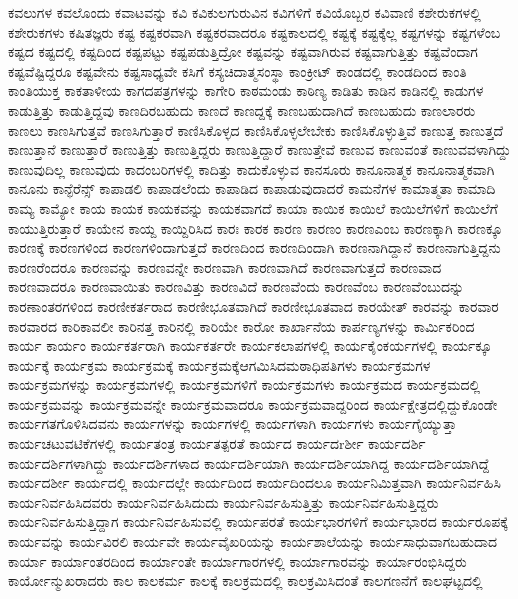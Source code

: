 {ಕವಲುಗಳ
ಕವಲೊಂದು
ಕವಾಟವನ್ನು
ಕವಿ
ಕವಿಕುಲಗುರುವಿನ
ಕವಿಗಳಿಗೆ
ಕವಿಯೊಬ್ಬರ
ಕವಿವಾಣಿ
ಕಶೇರುಕಗಳಲ್ಲಿ
ಕಶೇರುಕಗಳು
ಕಷಿತಜ್ಞರು
ಕಷ್ಟ
ಕಷ್ಟಕರವಾಗಿ
ಕಷ್ಟಕರವಾದರೂ
ಕಷ್ಟಕಾಲದಲ್ಲಿ
ಕಷ್ಟಕ್ಕೆ
ಕಷ್ಟಕ್ಕೆಲ್ಲ
ಕಷ್ಟಗಳನ್ನು
ಕಷ್ಟಗಳೆಂಬ
ಕಷ್ಟದ
ಕಷ್ಟದಲ್ಲಿ
ಕಷ್ಟದಿಂದ
ಕಷ್ಟಪಟ್ಟು
ಕಷ್ಟಪಡುತ್ತಿದ್ರೋ
ಕಷ್ಟವನ್ನು
ಕಷ್ಟವಾಗಿರುವ
ಕಷ್ಟವಾಗುತ್ತಿತ್ತು
ಕಷ್ಟವೆಂದಾಗ
ಕಷ್ಟವೆಷ್ಟಿದ್ದರೂ
ಕಷ್ಟವೇನು
ಕಷ್ಟಸಾಧ್ಯವೇ
ಕಸಿಗೆ
ಕಸ್ಯಚಿದಾತ್ಮಸಂಸ್ಥಾ
ಕಾಂಕ್ರೀಟ್
ಕಾಂಡದಲ್ಲಿ
ಕಾಂಡದಿಂದ
ಕಾಂತಿ
ಕಾಂತಿಯುಕ್ತ
ಕಾಕತಾಳೀಯ
ಕಾಗದಪತ್ರಗಳನ್ನು
ಕಾಗೇರಿ
ಕಾಠಮಂಡು
ಕಾಠಿಣ್ಯ
ಕಾಡಿತು
ಕಾಡಿನ
ಕಾಡಿನಲ್ಲಿ
ಕಾಡುಗಳ
ಕಾಡುತ್ತಿತ್ತು
ಕಾಡುತ್ತಿದ್ದವು
ಕಾಣದಿರಬಹುದು
ಕಾಣದೆ
ಕಾಣದ್ದಕ್ಕೆ
ಕಾಣಬಹುದಾಗಿದೆ
ಕಾಣಬಹುದು
ಕಾಣಲಾರರು
ಕಾಣಲು
ಕಾಣಸಿಗುತ್ತವೆ
ಕಾಣಸಿಗುತ್ತಾರೆ
ಕಾಣಿಸಿಕೊಳ್ಳದ
ಕಾಣಿಸಿಕೊಳ್ಳಲೇಬೇಕು
ಕಾಣಿಸಿಕೊಳ್ಳುತ್ತಿವೆ
ಕಾಣುತ್ತ
ಕಾಣುತ್ತದೆ
ಕಾಣುತ್ತಾನೆ
ಕಾಣುತ್ತಾರೆ
ಕಾಣುತ್ತಿತ್ತು
ಕಾಣುತ್ತಿದ್ದರು
ಕಾಣುತ್ತಿದ್ದಾರೆ
ಕಾಣುತ್ತೇವೆ
ಕಾಣುವ
ಕಾಣುವಂತೆ
ಕಾಣುವವಳಾಗಿದ್ದು
ಕಾಣುವುದಿಲ್ಲ
ಕಾಣುವುದು
ಕಾದಂಬರಿಗಳಲ್ಲಿ
ಕಾದಿತ್ತು
ಕಾದುಕೊಳ್ಳುವ
ಕಾನಸೂರು
ಕಾನೂನಾತ್ಮಕ
ಕಾನೂನಾತ್ಮಕವಾಗಿ
ಕಾನೂನು
ಕಾನ್ಫೆರೆನ್ಸ್
ಕಾಪಾಡಲಿ
ಕಾಪಾಡಲೆಂದು
ಕಾಪಾಡಿದ
ಕಾಪಾಡುವುದಾದರೆ
ಕಾಮನೆಗಳ
ಕಾಮಾತ್ಮತಾ
ಕಾಮಾದಿ
ಕಾಮ್ಯ
ಕಾಮ್ಯೋ
ಕಾಯ
ಕಾಯಕ
ಕಾಯಕವನ್ನು
ಕಾಯಕವಾಗದೆ
ಕಾಯಾ
ಕಾಯಿಕ
ಕಾಯಿಲೆ
ಕಾಯಿಲೆಗಳಿಗೆ
ಕಾಯಿಲೆಗೆ
ಕಾಯುತ್ತಿರುತ್ತಾರೆ
ಕಾಯೇನ
ಕಾಯ್ದ
ಕಾಯ್ದಿರಿಸಿದ
ಕಾರಃ
ಕಾರಕ
ಕಾರಣ
ಕಾರಣಂ
ಕಾರಣಎಂಬ
ಕಾರಣಕ್ಕಾಗಿ
ಕಾರಣಕ್ಕೂ
ಕಾರಣಕ್ಕೆ
ಕಾರಣಗಳಿಂದ
ಕಾರಣಗಳಿಂದಾಗುತ್ತದೆ
ಕಾರಣದಿಂದ
ಕಾರಣದಿಂದಾಗಿ
ಕಾರಣನಾಗಿದ್ದಾನೆ
ಕಾರಣನಾಗುತ್ತಿದ್ದನು
ಕಾರಣರೆಂದರೂ
ಕಾರಣವನ್ನು
ಕಾರಣವನ್ನೇ
ಕಾರಣವಾಗಿ
ಕಾರಣವಾಗಿದೆ
ಕಾರಣವಾಗುತ್ತದೆ
ಕಾರಣವಾದ
ಕಾರಣವಾದರೂ
ಕಾರಣವಾಯಿತು
ಕಾರಣವಿತ್ತು
ಕಾರಣವಿದೆ
ಕಾರಣವೆಂದು
ಕಾರಣವೆಂಬ
ಕಾರಣವೆಂಬುದನ್ನು
ಕಾರಣಾಂತರಗಳಿಂದ
ಕಾರಣೀಕರ್ತರಾದ
ಕಾರಣೀಭೂತವಾಗಿದೆ
ಕಾರಣೀಭೂತವಾದ
ಕಾರಯೇತ್
ಕಾರವನ್ನು
ಕಾರವಾರ
ಕಾರವಾರದ
ಕಾರಿಕಾವಲೀ
ಕಾರಿನತ್ತ
ಕಾರಿನಲ್ಲಿ
ಕಾರಿಯೇ
ಕಾರೋ
ಕಾರ್ಖಾನೆಯ
ಕಾರ್ಪಣ್ಯಗಳನ್ನು
ಕಾರ್ಮಿಕರಿಂದ
ಕಾರ್ಯ
ಕಾರ್ಯಂ
ಕಾರ್ಯಕರ್ತರಾಗಿ
ಕಾರ್ಯಕರ್ತರೇ
ಕಾರ್ಯಕಲಾಪಗಳಲ್ಲಿ
ಕಾರ್ಯಕೈಂಕರ್ಯಗಳಲ್ಲಿ
ಕಾರ್ಯಕ್ಕೂ
ಕಾರ್ಯಕ್ಕೆ
ಕಾರ್ಯಕ್ರಮ
ಕಾರ್ಯಕ್ರಮಕ್ಕೆ
ಕಾರ್ಯಕ್ರಮಕ್ಕೆಆಗಮಿಸಿದಮಠಾಧಿಪತಿಗಳು
ಕಾರ್ಯಕ್ರಮಗಳ
ಕಾರ್ಯಕ್ರಮಗಳನ್ನು
ಕಾರ್ಯಕ್ರಮಗಳಲ್ಲಿ
ಕಾರ್ಯಕ್ರಮಗಳಿಗೆ
ಕಾರ್ಯಕ್ರಮಗಳು
ಕಾರ್ಯಕ್ರಮದ
ಕಾರ್ಯಕ್ರಮದಲ್ಲಿ
ಕಾರ್ಯಕ್ರಮವನ್ನು
ಕಾರ್ಯಕ್ರಮವನ್ನೇ
ಕಾರ್ಯಕ್ರಮವಾದರೂ
ಕಾರ್ಯಕ್ರಮವಾದ್ದರಿಂದ
ಕಾರ್ಯಕ್ಷೇತ್ರದಲ್ಲಿದ್ದುಕೊಂಡೇ
ಕಾರ್ಯಗತಗೊಳಿಸಿದವನು
ಕಾರ್ಯಗಳನ್ನು
ಕಾರ್ಯಗಳಲ್ಲಿ
ಕಾರ್ಯಗಳಾಗಿ
ಕಾರ್ಯಗಳು
ಕಾರ್ಯಗೈಯ್ಯುತ್ತಾ
ಕಾರ್ಯಚಟುವಟಿಕೆಗಳಲ್ಲಿ
ಕಾರ್ಯತಂತ್ರ
ಕಾರ್ಯತತ್ಪರತೆ
ಕಾರ್ಯದ
ಕಾರ್ಯದrರ್ಶೀ
ಕಾರ್ಯದರ್ಶಿ
ಕಾರ್ಯದರ್ಶಿಗಳಾಗಿದ್ದು
ಕಾರ್ಯದರ್ಶಿಗಳಾದ
ಕಾರ್ಯದರ್ಶಿಯಾಗಿ
ಕಾರ್ಯದರ್ಶಿಯಾಗಿದ್ದ
ಕಾರ್ಯದರ್ಶಿಯಾಗಿದ್ದೆ
ಕಾರ್ಯದರ್ಶೀ
ಕಾರ್ಯದಲ್ಲಿ
ಕಾರ್ಯದಲ್ಲೇ
ಕಾರ್ಯದಿಂದ
ಕಾರ್ಯದಿಂದಲೂ
ಕಾರ್ಯನಿಮಿತ್ತವಾಗಿ
ಕಾರ್ಯನಿರ್ವಹಿಸಿ
ಕಾರ್ಯನಿರ್ವಹಿಸಿದವರು
ಕಾರ್ಯನಿರ್ವಹಿಸಿದುದು
ಕಾರ್ಯನಿರ್ವಹಿಸುತ್ತಿತ್ತು
ಕಾರ್ಯನಿರ್ವಹಿಸುತ್ತಿದ್ದರು
ಕಾರ್ಯನಿರ್ವಹಿಸುತ್ತಿದ್ದಾಗ
ಕಾರ್ಯನಿರ್ವಹಿಸುವಲ್ಲಿ
ಕಾರ್ಯಪರತೆ
ಕಾರ್ಯಭಾರಗಳಿಗೆ
ಕಾರ್ಯಭಾರದ
ಕಾರ್ಯರೂಪಕ್ಕೆ
ಕಾರ್ಯವನ್ನು
ಕಾರ್ಯವಿರಲಿ
ಕಾರ್ಯವೇ
ಕಾರ್ಯವೈಖರಿಯನ್ನು
ಕಾರ್ಯಶಾಲೆಯನ್ನು
ಕಾರ್ಯಸಾಧುವಾಗಬಹುದಾದ
ಕಾರ್ಯಾ
ಕಾರ್ಯಾಂತರದಿಂದ
ಕಾರ್ಯಾಂತೇ
ಕಾರ್ಯಾಗಾರಗಳಲ್ಲಿ
ಕಾರ್ಯಾಗಾರವನ್ನು
ಕಾರ್ಯಾರಂಭಿಸಿದ್ದರು
ಕಾರ್ಯೋನ್ಮುಖರಾದರು
ಕಾಲ
ಕಾಲಕರ್ಮ
ಕಾಲಕ್ಕೆ
ಕಾಲಕ್ರಮದಲ್ಲಿ
ಕಾಲಕ್ರಮಿಸಿದಂತೆ
ಕಾಲಗಣನೆಗೆ
ಕಾಲಘಟ್ಟದಲ್ಲಿ
}
